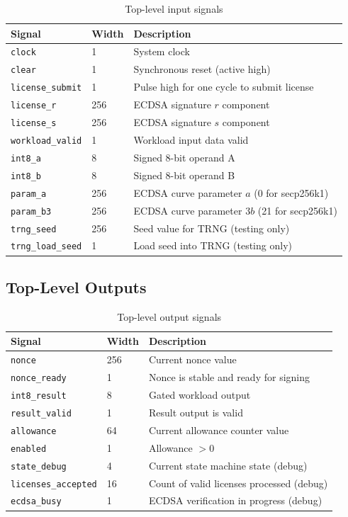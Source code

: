 \documentclass[11pt]{article}
\begin{document}
\begin{table}[h]
\centering
\begin{tabular}{@{}llp{7cm}@{}}
\toprule
\textbf{Signal} & \textbf{Width} & \textbf{Description} \\
\midrule
\texttt{clock} & 1 & System clock \\
\texttt{clear} & 1 & Synchronous reset (active high) \\
\midrule
\texttt{license\_submit} & 1 & Pulse high for one cycle to submit license \\
\texttt{license\_r} & 256 & ECDSA signature $r$ component \\
\texttt{license\_s} & 256 & ECDSA signature $s$ component \\
\midrule
\texttt{workload\_valid} & 1 & Workload input data valid \\
\texttt{int8\_a} & 8 & Signed 8-bit operand A \\
\texttt{int8\_b} & 8 & Signed 8-bit operand B \\
\midrule
\texttt{param\_a} & 256 & ECDSA curve parameter $a$ (0 for secp256k1) \\
\texttt{param\_b3} & 256 & ECDSA curve parameter $3b$ (21 for secp256k1) \\
\midrule
\texttt{trng\_seed} & 256 & Seed value for TRNG (testing only) \\
\texttt{trng\_load\_seed} & 1 & Load seed into TRNG (testing only) \\
\bottomrule
\end{tabular}
\caption{Top-level input signals}
\end{table}

\subsection{Top-Level Outputs}

\begin{table}[h]
\centering
\begin{tabular}{@{}llp{7cm}@{}}
\toprule
\textbf{Signal} & \textbf{Width} & \textbf{Description} \\
\midrule
\texttt{nonce} & 256 & Current nonce value \\
\texttt{nonce\_ready} & 1 & Nonce is stable and ready for signing \\
\midrule
\texttt{int8\_result} & 8 & Gated workload output \\
\texttt{result\_valid} & 1 & Result output is valid \\
\midrule
\texttt{allowance} & 64 & Current allowance counter value \\
\texttt{enabled} & 1 & Allowance $> 0$ \\
\midrule
\texttt{state\_debug} & 4 & Current state machine state (debug) \\
\texttt{licenses\_accepted} & 16 & Count of valid licenses processed (debug) \\
\texttt{ecdsa\_busy} & 1 & ECDSA verification in progress (debug) \\
\bottomrule
\end{tabular}
\caption{Top-level output signals}
\end{table}
\end{document}
